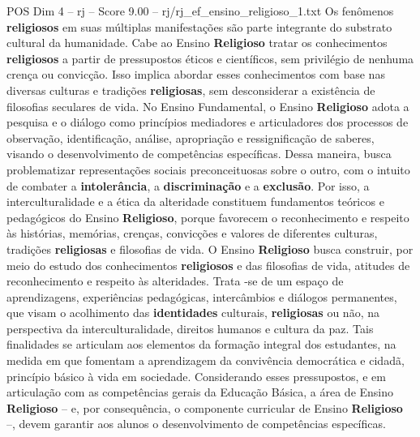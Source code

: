 \begin{textsample}{POS Dim 4 – rj – Score 9.00 – rj/rj\_ef\_ensino\_religioso\_1.txt}
Os fenômenos \textbf{religiosos} em suas múltiplas manifestações são parte integrante do substrato cultural da humanidade.
Cabe ao Ensino \textbf{Religioso} tratar os conhecimentos \textbf{religiosos} a partir de pressupostos éticos e científicos, sem privilégio de nenhuma crença ou convicção.
Isso implica abordar esses conhecimentos com base nas diversas culturas e tradições \textbf{religiosas}, sem desconsiderar a existência de filosofias seculares de vida.
No Ensino Fundamental, o Ensino \textbf{Religioso} adota a pesquisa e o diálogo como princípios mediadores e articuladores dos processos de observação, identificação, análise, apropriação e ressignificação de saberes, visando o desenvolvimento de competências específicas.
Dessa maneira, busca problematizar representações sociais preconceituosas sobre o outro, com o intuito de combater a \textbf{intolerância}, a \textbf{discriminação} e a \textbf{exclusão}.
Por isso, a interculturalidade e a ética da alteridade constituem fundamentos teóricos e pedagógicos do Ensino \textbf{Religioso}, porque favorecem o reconhecimento e respeito às histórias, memórias, crenças, convicções e valores de diferentes culturas, tradições \textbf{religiosas} e filosofias de vida.
O Ensino \textbf{Religioso} busca construir, por meio do estudo dos conhecimentos \textbf{religiosos} e das filosofias de vida, atitudes de reconhecimento e respeito às alteridades.
Trata -se de um espaço de aprendizagens, experiências pedagógicas, intercâmbios e diálogos permanentes, que visam o acolhimento das \textbf{identidades} culturais, \textbf{religiosas} ou não, na perspectiva da interculturalidade, direitos humanos e cultura da paz.
Tais finalidades se articulam aos elementos da formação integral dos estudantes, na medida em que fomentam a aprendizagem da convivência democrática e cidadã, princípio básico à vida em sociedade.
Considerando esses pressupostos, e em articulação com as competências gerais da Educação Básica, a área de Ensino \textbf{Religioso} – e, por consequência, o componente curricular de Ensino \textbf{Religioso} –, devem garantir aos alunos o desenvolvimento de competências específicas.

\end{textsample}
